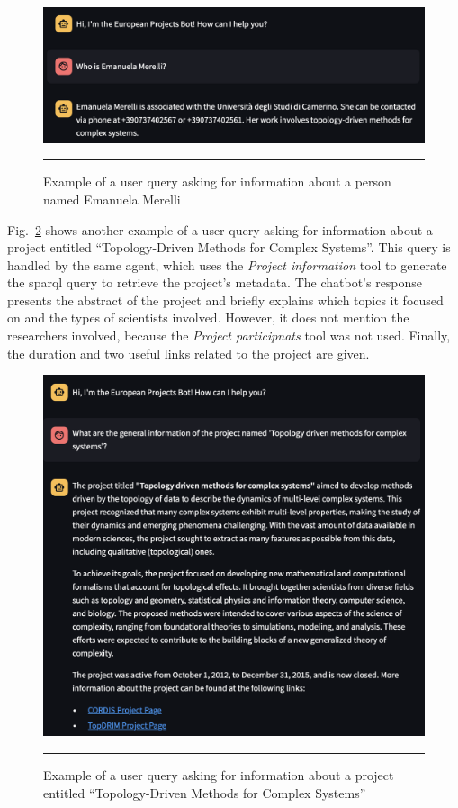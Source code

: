 \begin{figure}[htbp]
    \centering
 \includegraphics[width=.75\textwidth]{figures/implementation/example-who-is-emanuela-merelli.png}
     \rule{35em}{0.5pt}
    \caption{Example of a user query asking for information about a person named Emanuela Merelli}
 \label{fig:example-who-is-emanuela-merelli}
\end{figure}

Fig.~\ref{fig:example-general-info-about-topology-driven-methods-for-complex-systems-project} shows another example of a user query asking for information about a project entitled ``Topology-Driven Methods for Complex Systems''.
This query is handled by the same agent, which uses the \textit{Project information} tool to generate the \gls{sparql} query to retrieve the project's metadata.
The chatbot's response presents the abstract of the project and briefly explains which topics it focused on and the types of scientists involved.
However, it does not mention the researchers involved, because the \textit{Project participnats} tool was not used.
Finally, the duration and two useful links related to the project are given.

\begin{figure}[htbp]
    \centering
 \includegraphics[width=.8\textwidth]{figures/implementation/example-general-info-about-topology-driven-methods-for-complex-systems-project.png}
     \rule{35em}{0.5pt}
    \caption{Example of a user query asking for information about a project entitled ``Topology-Driven Methods for Complex Systems''}
 \label{fig:example-general-info-about-topology-driven-methods-for-complex-systems-project}
\end{figure}


